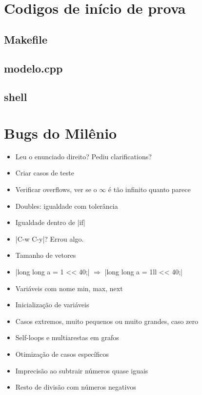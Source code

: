 \documentclass[oneside, landscape, twocolumn, a4wide, 9pt]{scrartcl}
\begin{document}
\tableofcontents
\thispagestyle{fancyplain}

\section{Codigos de início de prova}
\subsection{Makefile}
\subsection{modelo.cpp}
\subsection{shell}

\section{Bugs do Milênio}

\begin{itemize}
	\item Leu o enunciado direito? Pediu clarifications?
	\item Criar casos de teste
	\item Verificar overflows, ver se o $\infty$ é tão infinito quanto parece
	\item Doubles: igualdade com tolerância
	\item Igualdade dentro de |if|
	\item |C-w C-y|? Errou algo.
	\item Tamanho de vetores
	\item |long long a = 1 << 40;| $\Longrightarrow$ |long long a = 1ll << 40;| %
	\item Variáveis com nome min, max, next
	\item Inicialização de variáveis
	\item Casos extremos, muito pequenos ou muito grandes, caso zero
	\item Self-loops e multiarestas em grafos
	\item Otimização de casos específicos
	\item Imprecisão ao subtrair números quase iguais
	\item Resto de divisão com números negativos
\end{itemize}
\end{document}

